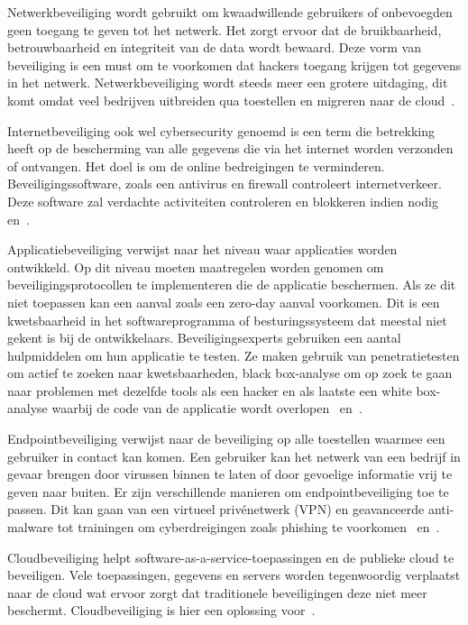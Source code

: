 Netwerkbeveiliging wordt gebruikt om kwaadwillende gebruikers of onbevoegden geen toegang te geven tot het netwerk. Het zorgt ervoor dat de bruikbaarheid, betrouwbaarheid en integriteit van de data wordt bewaard. Deze vorm van beveiliging is een must om te voorkomen dat hackers toegang krijgen tot gegevens in het netwerk. Netwerkbeveiliging wordt steeds meer een grotere uitdaging, dit komt omdat veel bedrijven uitbreiden qua toestellen en migreren naar de cloud~\autocite{Cisco}.

Internetbeveiliging ook wel cybersecurity genoemd is een term die betrekking heeft op de bescherming van alle gegevens die via het internet worden verzonden of ontvangen. Het doel is om de online bedreigingen te verminderen. Beveiligingssoftware, zoals een antivirus en firewall controleert internetverkeer. Deze software zal verdachte activiteiten controleren en blokkeren indien nodig~\autocite{Cisco} en~\autocite{Kieron2020}. 

Applicatiebeveiliging verwijst naar het niveau waar applicaties worden ontwikkeld. Op dit niveau moeten maatregelen worden genomen om beveiligingsprotocollen te implementeren die de applicatie beschermen. Als ze dit niet toepassen kan een aanval zoals een zero-day aanval voorkomen. Dit is een kwetsbaarheid in het softwareprogramma of besturingssysteem dat meestal niet gekent is bij de ontwikkelaars. Beveiligingsexperts gebruiken een aantal hulpmiddelen om hun applicatie te testen. Ze maken gebruik van penetratietesten om actief te zoeken naar kwetsbaarheden, black box-analyse om op zoek te gaan naar problemen met dezelfde tools als een hacker en als laatste een white box-analyse waarbij de code van de applicatie wordt overlopen~\autocite{Cisco} en~\autocite{Kieron2020}. 

Endpointbeveiliging verwijst naar de beveiliging op alle toestellen waarmee een gebruiker in contact kan komen. Een gebruiker kan het netwerk van een bedrijf in gevaar brengen door virussen binnen te laten of door gevoelige informatie vrij te geven naar buiten. Er zijn verschillende manieren om endpointbeveiliging toe te passen. Dit kan gaan van een virtueel privénetwerk (VPN) en geavanceerde anti-malware tot trainingen om cyberdreigingen zoals phishing te voorkomen~\autocite{Cisco} en~\autocite{Kieron2020}.

Cloudbeveiliging helpt software-as-a-service-toepassingen en de publieke cloud te beveiligen. Vele toepassingen, gegevens en servers worden tegenwoordig verplaatst naar de cloud wat ervoor zorgt dat traditionele beveiligingen deze niet meer beschermt. Cloudbeveiliging is hier een oplossing voor~\autocite{Cisco}.  

